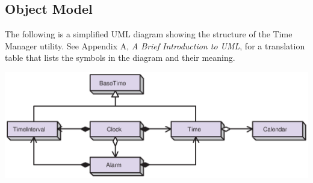 
\pagebreak
\subsection{Object Model}

The following is a simplified UML diagram showing the structure of the
Time Manager utility.  See Appendix A, {\it A Brief Introduction to UML},
for a translation table that lists the symbols in the diagram and their 
meaning.

\begin{center}
\includegraphics{TimeMgr_obj}   
\end{center}
